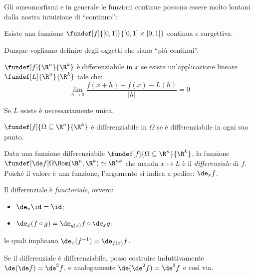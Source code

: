 Gli omeomorfismi e in generale le funzioni continue possono essere molto lontani dalla nostra intuizione di ``continuo'':

\begin{es}
	Esiste una funzione $\fundef[f]{[0,1]}{[0,1]\times[0,1]}$ continua e surgettiva.\footnotemark
\end{es}

Dunque vogliamo definire degli oggetti che siano ``più continui''.

\begin{defn}
	$\fundef[f]{\R^n}{\R^k}$ è differenziabile in $x$ se esiste un'applicazione lineare
	$\fundef[L]{\R^n}{\R^k}$ tale che:
	\[\lim_{h\to 0}{\frac{f(x+h)-f(x)-L(h)}{|h|}}=0\]
\end{defn}

\begin{fat}
	Se $L$ esiste è necessariamente unica.
\end{fat}

\begin{defn}
	$\fundef[f]{\Omega \subseteq \R^n}{\R^k}$ è differenziabile in $\Omega$
	se è differenziabile in ogni suo punto.
\end{defn}

\begin{defn}
	Data una funzione differenziabile $\fundef[f]{\Omega \subseteq \R^n}{\R^k}$,
	la funzione $\fundef[\de f]\Omega{\Hom(\R^n,\R^k)\simeq\R^{nk}}$
	che manda $x\mapsto L$
	è il \emph{differenziale} di $f$.
	Poiché il valore è una funzione, l'argomento si indica a pedice: $\de_x f$.
\end{defn}

\begin{oss}
	Il differenziale è \emph{functoriale}, ovvero:
	\begin{itemize}
		\item $\de_x\id=\id$;
		\item $\de_x(f\circ g)=\de_{g(x)}f\circ\de_xg$;
	\end{itemize}
	le quali implicano $\de_x(f^{-1})=\de_{f(x)}f$.
\end{oss}

\begin{oss}
	Se il differenziale è differenziabile,
	posso costruire induttivamente $\de(\de f) = \de^2f$,
	e analogamente $\de(\de^2f) = \de^3f$ e così via.
\end{oss}

